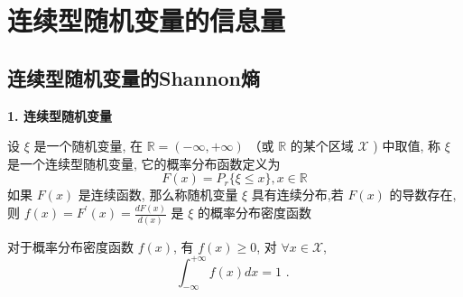 
\section{连续型随机变量的信息量}
\subsection{连续型随机变量的Shannon熵}

\textbf{1. 连续型随机变量}
\begin{definition}
    设 $ \xi $ 是一个随机变量, 在 $ \mathbb{R}=(-\infty,+\infty) $ （或 $ \mathbb{R} $ 的某个区域 $ \mathscr{X} $ ) 中取值, 称 $ \xi $ 是一个连续型随机变量, 它的概率分布函数定义为
$$
F(x)=P_r\{\xi \leqslant x\}, x \in \mathbb{R}
$$
如果 $ F(x) $ 是连续函数, 那么称随机变量 $ \xi $ 具有连续分布,若 $ F(x) $ 的导数存在, 则 $ f(x)=F^{\prime}(x)=\frac{d F(x)}{d(x)} $ 是 $ \xi $ 的概率分布密度函数
\end{definition}

\begin{remark}
  对于概率分布密度函数 $ f(x) $, 有 $ f(x) \geqslant 0 $, 对 $ \forall x \in \mathscr{X} $,
$$
\int_{-\infty}^{+\infty} f(x) d x=1 \text { . }
$$
\end{remark}

